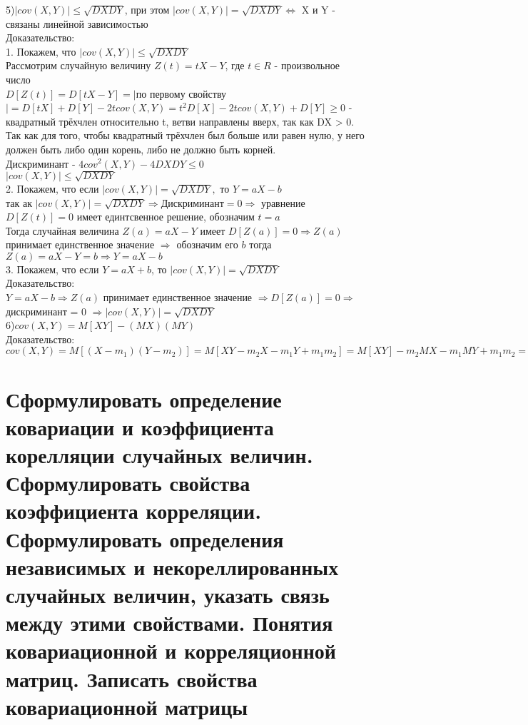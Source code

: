 5)$|cov(X, Y)| \leqslant \sqrt{DX DY}$, при этом $|cov(X, Y)| = \sqrt{DX DY} \Leftrightarrow $ X и Y - связаны линейной зависимостью\\
Доказательство:\\
1. Покажем, что $|cov(X, Y)| \leqslant \sqrt{DX DY}$\\
Рассмотрим случайную величину $Z(t) = tX - Y$, где $t \in R$  - произвольное число\\
$D[Z(t)] = D[tX - Y] = |$по первому свойству$| = D[tX] + D[Y] - 2t cov(X, Y) = t^{2} D[X] - 2t cov(X, Y) + D[Y] \geqslant 0$ - квадратный трёхчлен относительно t, ветви направлены вверх, так как DX > 0. Так как для того, чтобы квадратный трёхчлен был больше или равен нулю, у него должен быть либо один корень, либо не должно быть корней.\\
Дискриминант - $4cov^{2}(X, Y) - 4 DX DY \leqslant 0$\\
$|cov(X, Y)| \leqslant \sqrt{DX DY}$\\
2. Покажем, что если $|cov(X, Y)| = \sqrt{DX DY},$ то $Y = aX - b$\\
так ак $|cov(X, Y)| = \sqrt{DX DY} \Rightarrow $Дискриминант$ = 0 \Rightarrow $ уравнение $D[Z(t)] = 0$ имеет единтсвенное решение, обозначим $t = a$\\
Тогда случайная величина $Z(a) = aX - Y$ имеет $D[Z(a)] = 0 \Rightarrow Z(a)$ принимает единственное значение $\Rightarrow$ обозначим его $b$ тогда $Z(a) = aX - Y = b \Rightarrow Y = aX - b$\\
3. Покажем, что если $Y = aX + b$, то $|cov(X, Y)| = \sqrt{DX DY}$\\
Доказательство:\\
$Y = aX - b \Rightarrow Z(a)$ принимает единственное значение $\Rightarrow D[Z(a)] = 0 \Rightarrow $ дискриминант = 0 $\Rightarrow |cov(X, Y)| = \sqrt{DX DY}$\\

6)$cov(X, Y) = M[XY] - (MX)(MY)$\\
Доказательство:\\
$cov(X, Y) = M[(X - m_{1})(Y - m_{2})] = M[XY - m_{2} X - m_{1} Y + m_{1} m_{2}] = M[XY] - m_{2} MX - m_{1} MY + m_{1} m_{2} = M[XY] - m_{1} m_{2}$\\

\section{Сформулировать определение ковариации и коэффициента корелляции случайных величин. Сформулировать свойства коэффициента корреляции. Сформулировать определения независимых и некореллированных случайных величин, указать связь между этими свойствами. Понятия ковариационной и корреляционной матриц. Записать свойства ковариационной матрицы}

